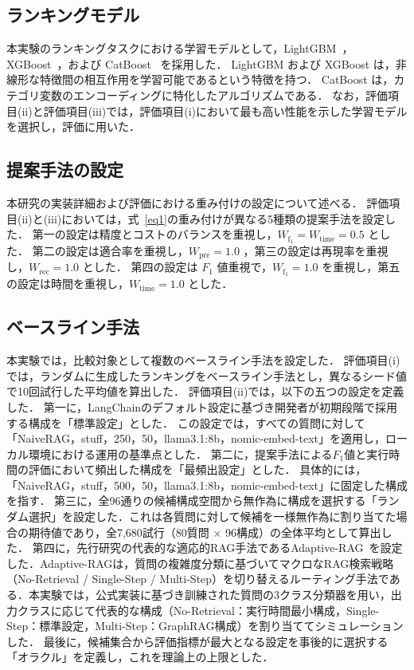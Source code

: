 \subsection{ランキングモデル} \label{sec4.2}
本実験のランキングタスクにおける学習モデルとして，LightGBM~\cite{KeGuolin17}，XGBoost~\cite{ChenTianqi16}，および CatBoost~\cite{Prokhorenkova18} を採用した．
LightGBM および XGBoost は，非線形な特徴間の相互作用を学習可能であるという特徴を持つ．
CatBoost は，カテゴリ変数のエンコーディングに特化したアルゴリズムである．
なお，評価項目(ii)と評価項目(iii)では，評価項目(i)において最も高い性能を示した学習モデルを選択し，評価に用いた．

\subsection{提案手法の設定} \label{sec4.3}
本研究の実装詳細および評価における重み付けの設定について述べる．
評価項目(ii)と(iii)においては，式~\eqref{eq1}の重み付けが異なる5種類の提案手法を設定した．
第一の設定は精度とコストのバランスを重視し，$W_{\mathrm{f_1}}=W_{\mathrm{time}}=0.5$ とした．
第二の設定は適合率を重視し，$W_{\mathrm{pre}}=1.0$ ，第三の設定は再現率を重視し，$W_{\mathrm{rec}}=1.0$ とした．
第四の設定は $F_1$ 値重視で，$W_{\mathrm{f_1}}=1.0$ を重視し，第五の設定は時間を重視し，$W_{\mathrm{time}}=1.0$ とした．

\subsection{ベースライン手法} \label{sec4.5}
本実験では，比較対象として複数のベースライン手法を設定した．
評価項目(i)では，ランダムに生成したランキングをベースライン手法とし，異なるシード値で10回試行した平均値を算出した．
評価項目(ii)では，以下の五つの設定を定義した．
第一に，LangChainのデフォルト設定に基づき開発者が初期段階で採用する構成を「標準設定」とした．
この設定では，すべての質問に対して「NaiveRAG，stuff，250，50，llama3.1:8b，nomic-embed-text」を適用し，ローカル環境における運用の基準点とした．
第二に，提案手法による$F_1$値と実行時間の評価において頻出した構成を「最頻出設定」とした．
具体的には，「NaiveRAG，stuff，500，50，llama3.1:8b，nomic-embed-text」に固定した構成を指す．
第三に，全96通りの候補構成空間から無作為に構成を選択する「ランダム選択」を設定した．これは各質問に対して候補を一様無作為に割り当てた場合の期待値であり，全7,680試行（80質問 $\times$ 96構成）の全体平均として算出した．
第四に，先行研究の代表的な適応的RAG手法であるAdaptive-RAG~\cite{Jeong24}を設定した．Adaptive-RAGは，質問の複雑度分類に基づいてマクロなRAG検索戦略（No-Retrieval / Single-Step / Multi-Step）を切り替えるルーティング手法である．本実験では，公式実装に基づき訓練された質問の3クラス分類器を用い，出力クラスに応じて代表的な構成（No-Retrieval：実行時間最小構成，Single-Step：標準設定，Multi-Step：GraphRAG構成）を割り当ててシミュレーションした．
最後に，候補集合から評価指標が最大となる設定を事後的に選択する「オラクル」を定義し，これを理論上の上限とした．

